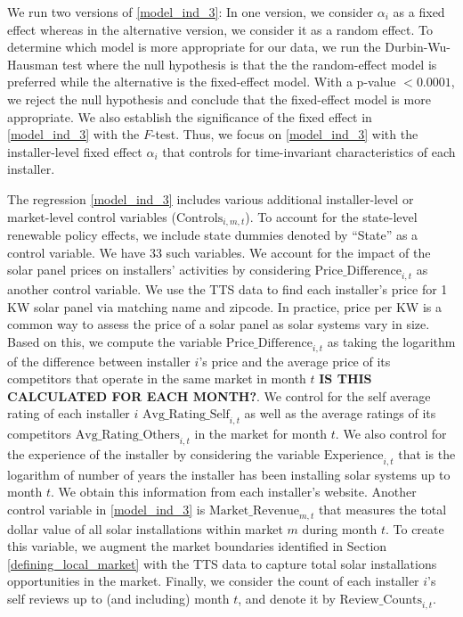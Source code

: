 \documentclass[msom,blindrev]{informs3}
\begin{document}
 We run two versions of \eqref{model_ind_3}: In one version, we consider $\alpha_{i}$ as a fixed effect whereas in the alternative version, we consider it as a random effect. To determine which model is more appropriate for our data, we run the Durbin-Wu-Hausman test where the null hypothesis is that the the random-effect model is preferred while the alternative is the fixed-effect model. With a p-value $<0.0001$, we reject the null hypothesis and conclude that the fixed-effect model is more appropriate. We also establish the significance of the fixed effect in \eqref{model_ind_3} with the $F$-test. Thus, we focus on \eqref{model_ind_3} with the installer-level fixed effect $\alpha_{i}$ that controls for time-invariant characteristics of each installer.


 The regression \eqref{model_ind_3} includes various additional installer-level or market-level control variables ($\text{Controls}_{i,m,t}$). To account for the state-level renewable policy effects, we include state dummies denoted by ``State'' as a control variable. We have 33 such variables. We account for the impact of the solar panel prices on installers' activities by considering $\text{Price\_Difference}_{i,t}$ as another control variable. We use the TTS data to find each installer's price for 1 KW solar panel via matching name and zipcode. In practice, price per KW is a common way to assess the price of a solar panel as solar systems vary in size. Based on this, we compute the variable $\text{Price\_Difference}_{i,t}$ as taking the logarithm of the difference between installer $i$'s price and the average price of its competitors that operate in the same market in month $t$ \textbf{IS THIS CALCULATED FOR EACH MONTH?}.
 We control for the self average rating of each installer $i$ $\text{Avg\_Rating\_Self}_{i,t}$  as well as the average ratings of its competitors $\text{Avg\_Rating\_Others}_{i,t}$ in the market for month $t$. We also control for the experience of the installer by considering the variable $\text{Experience}_{i,t}$ that is the logarithm of number of years the installer has been installing solar systems up to month $t$. We obtain this information from each installer's website. Another control variable in \eqref{model_ind_3} is $\text{Market\_Revenue}_{m,t}$  that measures the total dollar value of all solar installations within market $m$ during month $t$. To create this variable, we augment the market boundaries identified in Section \ref{defining_local_market} with the TTS data to capture total  solar installations opportunities in the market. Finally, we consider the count of each installer $i$'s self reviews up to (and including) month $t$, and denote it by $\text{Review\_Counts}_{i,t}$.
\end{document}
